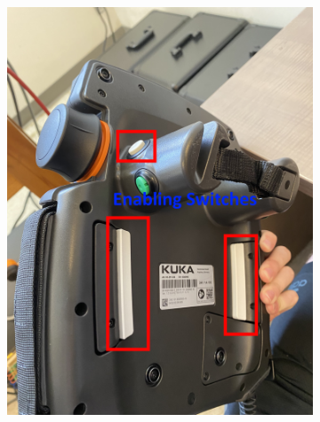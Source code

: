 \documentclass[12pt, letterpaper]{article}
\begin{document}
\begin{figure}[h!]
\begin{subfigure}[b]{0.32\textwidth}
        \includegraphics[width=\textwidth]{Images/ImportantButtonsBack.jpg}
        \caption{}
        \label{fig:buttonsback}
    \end{subfigure}
    \hfill
    \begin{subfigure}[b]{0.32\textwidth}
        \centering

\end{subfigure}
\end{figure}
\end{document}
